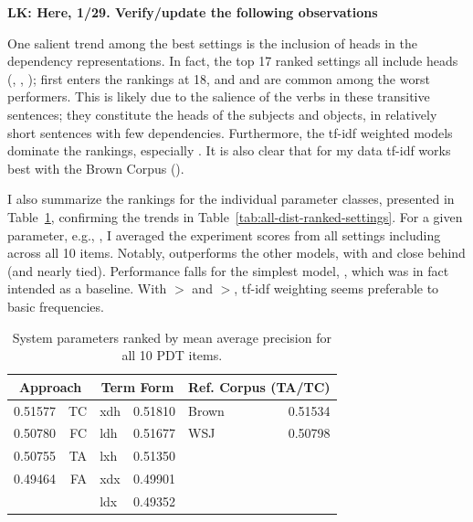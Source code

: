 \bigskip
\textbf{LK: Here, 1/29. Verify/update the following observations}
\bigskip

One salient trend among the best settings is the inclusion of heads in the dependency representations. In fact, the top 17 ranked settings all include heads (, , );  first enters the rankings at 18, and  and  are common among the worst performers. This is likely due to the salience of the verbs in these transitive sentences; they constitute the heads of the subjects and objects, in relatively short sentences with few dependencies.
Furthermore, the tf-idf weighted models dominate the rankings, especially . It is also clear that for my data tf-idf works best with the Brown Corpus ().

I also summarize the rankings for the individual parameter classes,
presented in Table~\ref{tab:dist-ranked-parameters}, confirming the
trends in Table~\ref{tab:all-dist-ranked-settings}. For a given
parameter, e.g., , I averaged the experiment scores from
all settings including  across all 10 items. Notably,  outperforms the other models, with  and  close behind (and nearly tied). Performance falls for the simplest model, , which was in fact intended as a baseline. With $>$ and $>$, tf-idf weighting seems preferable to basic frequencies.

\begin{table}
\begin{center}
\begin{tabular}{|l|r||l|r||l|r|}
\hline
\multicolumn{2}{|c||}{Approach} & \multicolumn{2}{|c||}{Term Form} & \multicolumn{2}{|c||}{Ref. Corpus (TA/TC)} \\
\hline
\hline
0.51577 & TC & xdh & 0.51810 & Brown & 0.51534 \\
\hline
0.50780 & FC & ldh & 0.51677 & WSJ & 0.50798 \\
\hline
0.50755 & TA & lxh & 0.51350 & & \\
\hline
0.49464 & FA & xdx & 0.49901 & & \\
\hline
& 	& ldx & 0.49352 &  & \\
\hline
\end{tabular}
\caption{System parameters ranked by mean average precision for all 10 PDT items.}
\label{tab:dist-ranked-parameters}
\end{center}
\end{table}

